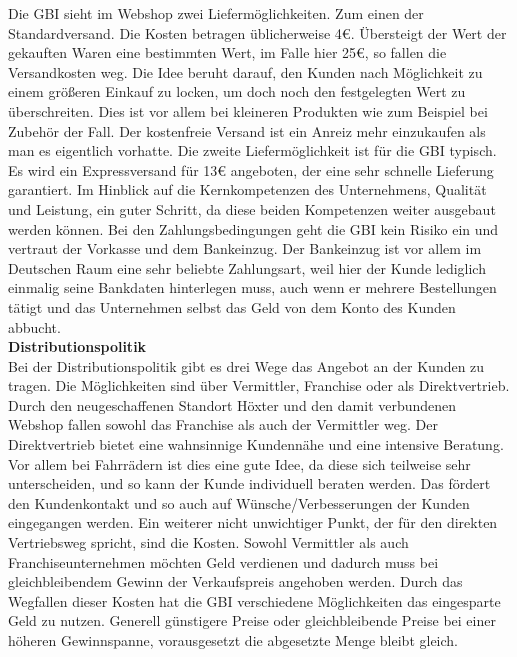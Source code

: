 Die GBI sieht im Webshop zwei Liefermöglichkeiten. Zum einen der Standardversand. Die Kosten betragen üblicherweise 4€. Übersteigt der Wert der gekauften Waren eine bestimmten Wert, im Falle hier 25€, so fallen die Versandkosten weg. Die Idee beruht darauf, den Kunden nach Möglichkeit zu einem größeren Einkauf zu locken, um doch noch den festgelegten Wert zu überschreiten. Dies ist vor allem bei kleineren Produkten wie zum Beispiel bei Zubehör der Fall. Der kostenfreie Versand ist ein Anreiz mehr einzukaufen als man es eigentlich vorhatte. Die zweite Liefermöglichkeit ist für die GBI typisch. Es wird ein Expressversand für 13€ angeboten, der eine sehr schnelle Lieferung garantiert. Im Hinblick auf die Kernkompetenzen des Unternehmens, Qualität und Leistung,  ein guter Schritt, da diese beiden Kompetenzen weiter ausgebaut werden können. Bei den Zahlungsbedingungen geht die GBI kein Risiko ein und vertraut der Vorkasse und dem Bankeinzug. Der Bankeinzug ist vor allem im Deutschen Raum eine sehr beliebte Zahlungsart, weil hier der Kunde lediglich einmalig seine Bankdaten hinterlegen muss, auch wenn er mehrere Bestellungen tätigt und das Unternehmen selbst das Geld von dem Konto des Kunden abbucht.\\

\small{\textbf{Distributionspolitik}}\\
Bei der Distributionspolitik gibt es drei Wege das Angebot an der Kunden zu tragen. Die Möglichkeiten sind über Vermittler, Franchise oder als Direktvertrieb. Durch den neugeschaffenen Standort Höxter und den damit verbundenen Webshop fallen sowohl das Franchise als auch der Vermittler weg. Der Direktvertrieb bietet eine wahnsinnige Kundennähe und eine intensive Beratung. Vor allem bei Fahrrädern ist dies eine gute Idee, da diese sich teilweise sehr unterscheiden, und so kann der Kunde individuell beraten werden. Das fördert den Kundenkontakt und so auch auf Wünsche/Verbesserungen der Kunden eingegangen werden. Ein weiterer nicht unwichtiger Punkt, der für den direkten Vertriebsweg spricht, sind die Kosten. Sowohl Vermittler als auch Franchiseunternehmen möchten Geld verdienen und dadurch muss bei gleichbleibendem Gewinn der Verkaufspreis angehoben werden. Durch das Wegfallen dieser Kosten hat die GBI verschiedene Möglichkeiten das eingesparte Geld zu nutzen. Generell günstigere Preise oder gleichbleibende Preise bei einer höheren Gewinnspanne, vorausgesetzt die abgesetzte Menge bleibt gleich.

